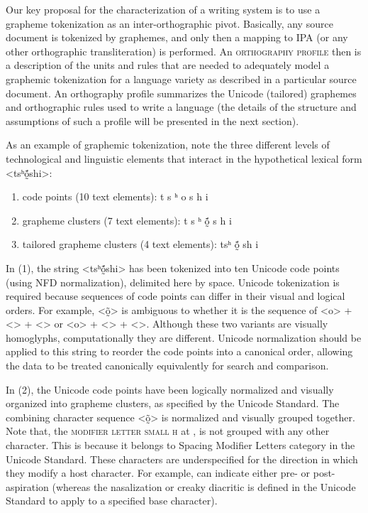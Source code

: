 Our key proposal for the characterization of a writing system is to use a
grapheme tokenization as an inter-orthographic pivot. Basically, any source
document is tokenized by graphemes, and only then a mapping to IPA (or any other
orthographic transliteration) is performed. An \textsc{orthography profile} then is a
description of the units and rules that are needed to adequately model a
graphemic tokenization for a language variety as described in a particular
source document. An orthography profile summarizes the Unicode (tailored)
graphemes and orthographic rules used to write a language (the details of the
structure and assumptions of such a profile will be presented in the next
section).


As an example of graphemic tokenization, note the three different levels of
technological and linguistic elements that interact in the hypothetical lexical
form <tsʰṍ̰shi>:

\begin{enumerate}
	\def\labelenumi{\arabic{enumi}.} 
	\item code points (10 text elements): t s ʰ o    s h i 
	\item grapheme clusters (7 text elements): t s ʰ ṍ̰ s h i 
	\item tailored grapheme clusters (4 text elements): tsʰ ṍ̰ sh i 
\end{enumerate}

In (1), the string <tsʰṍ̰shi> has been tokenized into ten Unicode code points
(using NFD normalization), delimited here by space. Unicode tokenization is
required because sequences of code points can differ in their visual and logical
orders. For example, <õ̰> is ambiguous to whether it is the sequence of <o> +
<> + <> or <o> + <> + <>. Although these two variants are visually homoglyphs,
computationally they are different. Unicode normalization should be applied to
this string to reorder the code points into a canonical order, allowing the data
to be treated canonically equivalently for search and comparison. 

In (2), the
Unicode code points have been logically normalized and visually organized into
grapheme clusters, as specified by the Unicode Standard. The combining character
sequence <õ̰> is normalized and visually grouped together. Note that, the
\textsc{modifier letter small h} at , is not grouped with any 
other character. This is because it
belongs to Spacing Modifier Letters category in the Unicode Standard. These
characters are underspecified for the direction in which they modify a host
character. For example, can indicate either pre- or post-aspiration (whereas the
nasalization or creaky diacritic is defined in the Unicode Standard to apply to
a specified base character). 

